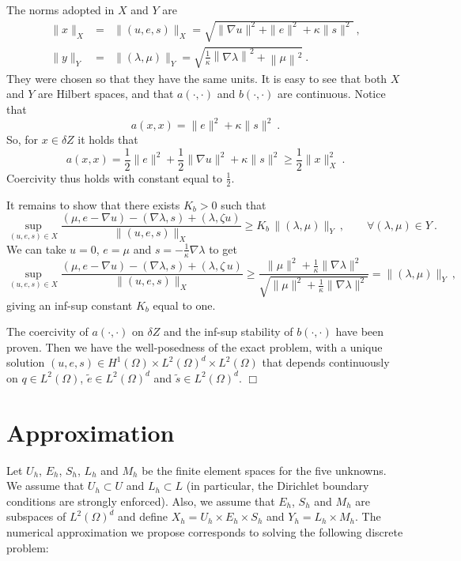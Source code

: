 \documentclass{article}
\begin{document}
The norms adopted in $X$ and $Y$ are 
\begin{eqnarray}
\|x\|_X &=& \|(u,e,s)\|_X = \sqrt{\|\nabla u\|^2+\|e\|^2+\kappa \|s\|^2}~,\\
\|y\|_Y &=& \|(\lambda,\mu)\|_Y=\sqrt{\frac{1}{\kappa}\left \| \nabla \lambda\right \|^2+\left\|\mu\right \|^2}~.
\end{eqnarray}
They were chosen so that they have the same units. It is easy to see that both $X$ and $Y$ are Hilbert spaces, and that $a(\cdot,\cdot)$ and $b(\cdot,\cdot)$ are continuous. Notice that
$$
a(x,x)=\|e\|^2 + \kappa \|s\|^2 ~.
$$
So, for $x\in \delta Z$ it holds that
$$
a(x,x)= \frac12 \|e\|^2 +\frac12 \|\nabla u\|^2+ \kappa \|s\|^2 \geq \frac12 \|x\|_X^2~.
$$
Coercivity thus holds with constant equal to $\frac12$.


It remains to show that there exists $K_b>0$ such that
\begin{equation}
\sup_{(u,e,s)\in X} \frac{\left (\mu,e-\nabla u \right ) - \left (\nabla \lambda, s \right ) + \left ( \lambda, \zeta u \right )}{\|(u,e,s)\|_X} \geq K_b \, \|(\lambda,\mu)\|_{Y}~,\qquad \forall (\lambda,\mu)\in Y~.
\end{equation}
We can take $u=0$, $e=\mu$
and $s=-\frac{1}{\kappa}\nabla \lambda$ to get
$$
\sup_{(u,e,s)\in X} \frac{\left (\mu,e-\nabla u \right ) - \left (\nabla \lambda, s \right ) + \left ( \lambda, \zeta\,u \right )}{\|(u,e,s)\|_X} 
\geq \frac{\|\mu\|^2 + \frac{1}{\kappa}\|\nabla \lambda\|^2}{\sqrt{\|\mu\|^2 + \frac{1}{\kappa}\|\nabla \lambda \|^2}} = \|(\lambda,\mu)\|_Y~,
$$
giving an inf-sup constant $K_b$ equal to one.

The coercivity of $a(\cdot,\cdot)$ on $\delta Z$ and the inf-sup stability of $b(\cdot,\cdot)$ have been proven. Then we have the well-posedness of the exact problem, with a unique solution $(u,e,s)\in H^1(\Omega)\times L^2(\Omega)^d \times L^2(\Omega)$ that depends continuously on $q\in L^2(\Omega)$, $\tilde{e}\in L^2(\Omega)^d$ and $\tilde{s}\in L^2(\Omega)^d$. $\Box$

\section{Approximation}

Let $U_h$, $E_h$, $S_h$, $L_h$ and $M_h$ be the finite element spaces for the five unknowns. We assume that $U_h\subset U$ and $L_h\subset L$ (in particular, the Dirichlet boundary conditions are strongly enforced). 
Also, we assume that $E_h$, $S_h$ and $M_h$ are subspaces of $L^2(\Omega)^d$ and define $X_h=U_h\times E_h \times S_h$ and $Y_h=L_h\times M_h$. The numerical approximation we propose corresponds to solving the following discrete problem:
\end{document}
